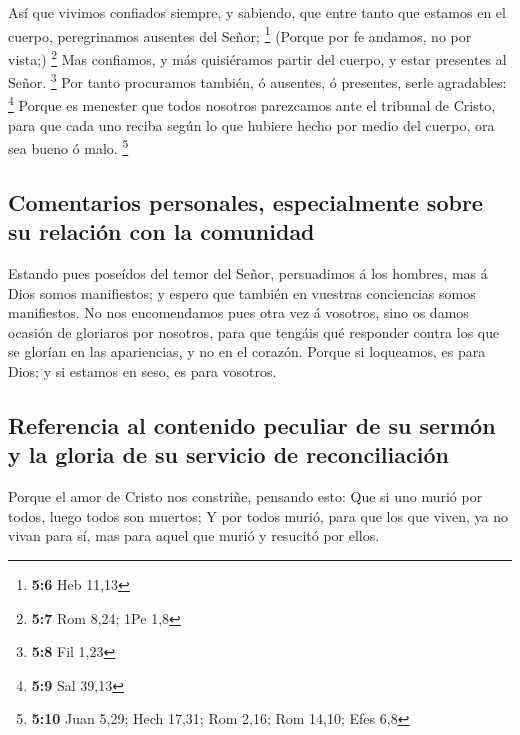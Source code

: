  Así que vivimos confiados siempre, y sabiendo, que entre
tanto que estamos en el cuerpo, peregrinamos ausentes del Señor;
\footnote{\textbf{5:6} Heb 11,13}  (Porque por fe andamos,
no por vista;) \footnote{\textbf{5:7} Rom 8,24; 1Pe 1,8} 
Mas confiamos, y más quisiéramos partir del cuerpo, y estar presentes al
Señor. \footnote{\textbf{5:8} Fil 1,23}  Por tanto
procuramos también, ó ausentes, ó presentes, serle agradables:
\footnote{\textbf{5:9} Sal 39,13}  Porque es menester que
todos nosotros parezcamos ante el tribunal de Cristo, para que cada uno
reciba según lo que hubiere hecho por medio del cuerpo, ora sea bueno ó
malo. \footnote{\textbf{5:10} Juan 5,29; Hech 17,31; Rom 2,16; Rom
  14,10; Efes 6,8}

\hypertarget{comentarios-personales-especialmente-sobre-su-relaciuxf3n-con-la-comunidad}{%
\subsection{Comentarios personales, especialmente sobre su relación con
la
comunidad}\label{comentarios-personales-especialmente-sobre-su-relaciuxf3n-con-la-comunidad}}

 Estando pues poseídos del temor del Señor, persuadimos á
los hombres, mas á Dios somos manifiestos; y espero que también en
vuestras conciencias somos manifiestos.  No nos
encomendamos pues otra vez á vosotros, sino os damos ocasión de
gloriaros por nosotros, para que tengáis qué responder contra los que se
glorían en las apariencias, y no en el corazón.  Porque si
loqueamos, es para Dios; y si estamos en seso, es para vosotros.

\hypertarget{referencia-al-contenido-peculiar-de-su-sermuxf3n-y-la-gloria-de-su-servicio-de-reconciliaciuxf3n}{%
\subsection{Referencia al contenido peculiar de su sermón y la gloria de
su servicio de
reconciliación}\label{referencia-al-contenido-peculiar-de-su-sermuxf3n-y-la-gloria-de-su-servicio-de-reconciliaciuxf3n}}

 Porque el amor de Cristo nos constriñe, pensando esto: Que
si uno murió por todos, luego todos son muertos;  Y por
todos murió, para que los que viven, ya no vivan para sí, mas para aquel
que murió y resucitó por ellos.

